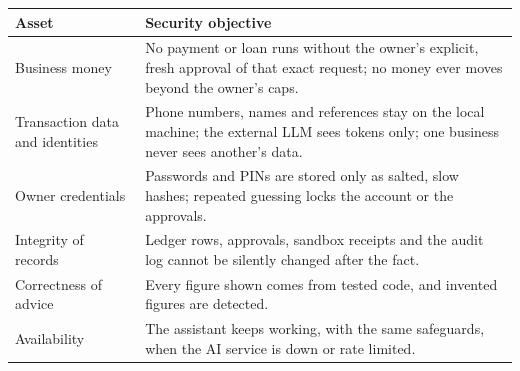 \documentclass[10pt,a4paper]{article}
\begin{document}
\begin{center}
\begin{tabularx}{\textwidth}{@{}p{3.4cm}Y@{}}
\toprule
\textbf{Asset} & \textbf{Security objective}\\
\midrule
Business money & No payment or loan runs without the owner's explicit, fresh approval of that exact request; no money ever moves beyond the owner's caps.\\
Transaction data and identities & Phone numbers, names and references stay on the local machine; the external LLM sees tokens only; one business never sees another's data.\\
Owner credentials & Passwords and PINs are stored only as salted, slow hashes; repeated guessing locks the account or the approvals.\\
Integrity of records & Ledger rows, approvals, sandbox receipts and the audit log cannot be silently changed after the fact.\\
Correctness of advice & Every figure shown comes from tested code, and invented figures are detected.\\
Availability & The assistant keeps working, with the same safeguards, when the AI service is down or rate limited.\\
\bottomrule
\end{tabularx}
\end{center}
\end{document}
